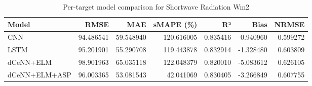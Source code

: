 \begin{table}
\caption{Per-target model comparison for Shortwave Radiation Wm2}
\begin{tabular}{lrrrrrr}
\toprule
Model & RMSE & MAE & sMAPE (\%) & R² & Bias & NRMSE \\
\midrule
CNN & 94.486541 & 59.548940 & 120.616005 & 0.835416 & -0.940960 & 0.599272 \\
LSTM & 95.201901 & 55.290708 & 119.443878 & 0.832914 & -1.328480 & 0.603809 \\
dCeNN+ELM & 98.901963 & 65.035118 & 122.048379 & 0.820010 & -5.083612 & 0.626105 \\
dCeNN+ELM+ASP & 96.003365 & 53.081543 & 42.041069 & 0.830405 & -3.266849 & 0.607755 \\
\bottomrule
\end{tabular}
\end{table}
